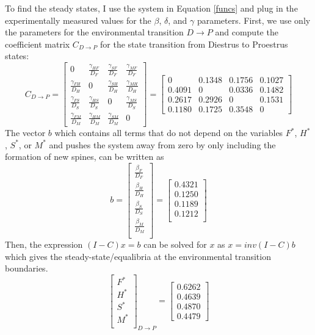\documentclass[11pt]{article}
\begin{document}
To find the steady states, I use the system in Equation \ref{funcs} and plug in the experimentally measured values for the $\beta$, $\delta$, and $\gamma$ parameters. First, we use only the parameters for the environmental transition $D\to P$ and compute the coefficient matrix $C_{D \to P}$ for the state transition from Diestrus to Proestrus states:
\begin{equation}
C_{D\to P}=
\begin{bmatrix}
0 & \frac{\gamma_{HF}}{D_F} & \frac{\gamma_{SF}}{D_F} & \frac{\gamma_{MF}}{D_F}\\
\frac{\gamma_{FH}}{D_H} & 0 & \frac{\gamma_{SH}}{D_H} & \frac{\gamma_{MH}}{D_H}\\
\frac{\gamma_{FS}}{D_S} & \frac{\gamma_{HS}}{D_S} & 0 & \frac{\gamma_{MS}}{D_S}\\
\frac{\gamma_{FM}}{D_M} & \frac{\gamma_{HM}}{D_M} & \frac{\gamma_{SM}}{D_M} & 0
\end{bmatrix}=
\begin{bmatrix}
0 & 0.1348 & 0.1756 & 0.1027\\
0.4091 & 0 & 0.0336 & 0.1482\\
0.2617 & 0.2926 & 0 & 0.1531\\
0.1180 & 0.1725 & 0.3548 & 0
\end{bmatrix}\label{matC}
\end{equation}
The vector $b$ which contains all terms that do not depend on the variables $F^*$, $H^*$, $S^*$, or $M^*$ and pushes the system away from zero by only including the formation of new spines, can be written as
\begin{equation}
b= \begin{bmatrix}
\frac{\beta_F}{D_F}\\
\frac{\beta_H}{D_H}\\
\frac{\beta_S}{D_S}\\
\frac{\beta_M}{D_M}\\
\end{bmatrix}=
\begin{bmatrix}
0.4321\\
0.1250\\
0.1189\\
0.1212\\
\end{bmatrix}\label{vecB}
\end{equation}
Then, the expression $(I-C)x=b$ can be solved for $x$ as $x=inv(I-C)b$ which gives the steady-state/equalibria at the environmental transition boundaries.
\[\begin{bmatrix}
F^*\\H^*\\S^*\\M^*\\
\end{bmatrix}_{D \to P}= 
\begin{bmatrix}
0.6262\\0.4639\\0.4870\\0.4479
\end{bmatrix}\]
\end{document}
